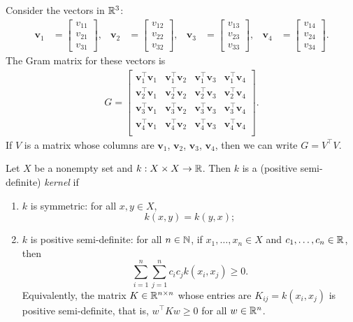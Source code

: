\begin{example}
    \def\v{\mathbf{v}}
    Consider the vectors in \(\mathbb{R}^3\):
    \begin{align*}
        \v_1 &=
        \begin{bmatrix}
            v_{11} \\ v_{21} \\ v_{31}
        \end{bmatrix},&
        \v_2 &=
        \begin{bmatrix}
            v_{12} \\ v_{22} \\ v_{32}
        \end{bmatrix},&
        \v_3 &=
        \begin{bmatrix}
            v_{13} \\ v_{23} \\ v_{33}
        \end{bmatrix},&
        \v_4 &=
        \begin{bmatrix}
            v_{14} \\ v_{24} \\ v_{34}
        \end{bmatrix}.
    \end{align*}
    The Gram matrix for these vectors is
    \begin{align*}
        G = \begin{bmatrix}
            \v_1^\top \v_1 & \v_1^\top \v_2 & \v_1^\top \v_3 & \v_1^\top \v_4\\[3pt]
            \v_2^\top \v_1 & \v_2^\top \v_2 & \v_2^\top \v_3 & \v_2^\top \v_4\\[3pt]
            \v_3^\top \v_1 & \v_3^\top \v_2 & \v_3^\top \v_3 & \v_3^\top \v_4\\[3pt]
            \v_4^\top \v_1 & \v_4^\top \v_2 & \v_4^\top \v_3 & \v_4^\top \v_4\\
        \end{bmatrix}.
    \end{align*}
    If \(V\) is a matrix whose columns are \(\v_1\), \(\v_2\), \(\v_3\), \(\v_4\), then we can write \(G = V^\top V\).
\end{example}

\begin{definition}[kernel]
    Let \(X\) be a nonempty set and \(k : X \times X \to \mathbb{R}\).
    Then \(k\) is a (positive semi-definite) \textit{kernel} if
    \begin{enumerate}
        \item \(k\) is symmetric: for all \(x,y \in X\),
        \[k(x,y) = k(y,x);\]
        \item \(k\) is positive semi-definite: for all \(n \in \mathbb{N}\), if \(x_1, \dots, x_n \in X\) and \(c_1, \dots, c_n \in \mathbb{R}\), then
        \[\sum_{i=1}^{n}\sum_{j=1}^{n} c_i c_j k(x_i, x_j) \geq 0.\]
        Equivalently, the matrix \(K \in \mathbb{R}^{n \times n}\) whose entries are \(K_{ij} = k(x_i, x_j)\) is positive semi-definite, that is, \(w^\top K w \geq 0\) for all \(w \in \mathbb{R}^n\).
    \end{enumerate}
\end{definition}

